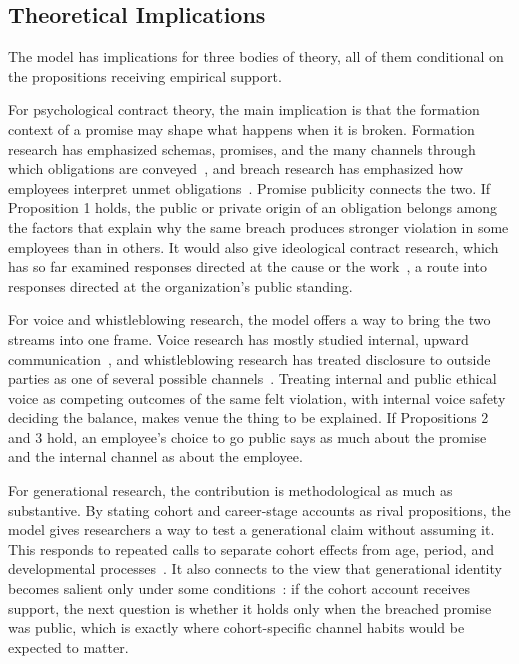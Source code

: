 \subsection{Theoretical Implications}

The model has implications for three bodies of theory, all of them conditional on the propositions receiving empirical support.

For psychological contract theory, the main implication is that the formation context of a promise may shape what happens when it is broken. Formation research has emphasized schemas, promises, and the many channels through which obligations are conveyed~\citep{rousseau2001schema}, and breach research has emphasized how employees interpret unmet obligations~\citep{morrison1997employees,robinson2000development}. Promise publicity connects the two. If Proposition 1 holds, the public or private origin of an obligation belongs among the factors that explain why the same breach produces stronger violation in some employees than in others. It would also give ideological contract research, which has so far examined responses directed at the cause or the work~\citep{yang2022going,deng2023serving}, a route into responses directed at the organization's public standing.

For voice and whistleblowing research, the model offers a way to bring the two streams into one frame. Voice research has mostly studied internal, upward communication~\citep{morrison2014employee,morrison2023employee}, and whistleblowing research has treated disclosure to outside parties as one of several possible channels~\citep{miceli2008whistleblowing,culiberg2017evolution}. Treating internal and public ethical voice as competing outcomes of the same felt violation, with internal voice safety deciding the balance, makes venue the thing to be explained. If Propositions 2 and 3 hold, an employee's choice to go public says as much about the promise and the internal channel as about the employee.

For generational research, the contribution is methodological as much as substantive. By stating cohort and career-stage accounts as rival propositions, the model gives researchers a way to test a generational claim without assuming it. This responds to repeated calls to separate cohort effects from age, period, and developmental processes~\citep{parry2011generational,rudolph2017considering,rudolph2021generations}. It also connects to the view that generational identity becomes salient only under some conditions~\citep{joshi2010unpacking}: if the cohort account receives support, the next question is whether it holds only when the breached promise was public, which is exactly where cohort-specific channel habits would be expected to matter.

